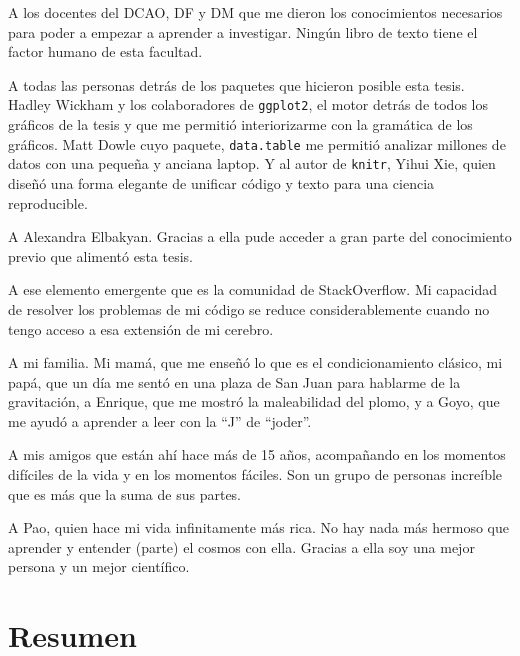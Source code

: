\documentclass[spanish,a4paper,12pt,oneside]{book}
\begin{document}
A los docentes del DCAO, DF y DM que me dieron los conocimientos
necesarios para poder a empezar a aprender a investigar. Ningún libro de
texto tiene el factor humano de esta facultad.

A todas las personas detrás de los paquetes que hicieron posible esta
tesis. Hadley Wickham y los colaboradores de \texttt{ggplot2}, el motor
detrás de todos los gráficos de la tesis y que me permitió
interiorizarme con la gramática de los gráficos. Matt Dowle cuyo
paquete, \texttt{data.table} me permitió analizar millones de datos con
una pequeña y anciana laptop. Y al autor de \texttt{knitr}, Yihui Xie,
quien diseñó una forma elegante de unificar código y texto para una
ciencia reproducible.

A Alexandra Elbakyan. Gracias a ella pude acceder a gran parte del
conocimiento previo que alimentó esta tesis.

A ese elemento emergente que es la comunidad de StackOverflow. Mi
capacidad de resolver los problemas de mi código se reduce
considerablemente cuando no tengo acceso a esa extensión de mi cerebro.

A mi familia. Mi mamá, que me enseñó lo que es el condicionamiento
clásico, mi papá, que un día me sentó en una plaza de San Juan para
hablarme de la gravitación, a Enrique, que me mostró la maleabilidad del
plomo, y a Goyo, que me ayudó a aprender a leer con la ``J'' de
``joder''.

A mis amigos que están ahí hace más de 15 años, acompañando en los
momentos difíciles de la vida y en los momentos fáciles. Son un grupo de
personas increíble que es más que la suma de sus partes.

A Pao, quien hace mi vida infinitamente más rica. No hay nada más
hermoso que aprender y entender (parte) el cosmos con ella. Gracias a
ella soy una mejor persona y un mejor científico.

\newpage
{}
\chapter*{Resumen}
\end{document}
